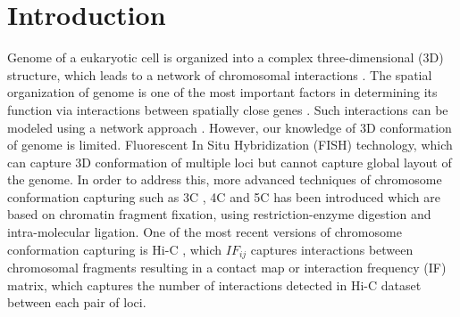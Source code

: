 \documentclass[a4,center,fleqn]{NAR}
\begin{document}
\section{Introduction}
Genome of a eukaryotic cell is organized into a
complex three-dimensional (3D) structure, which
leads to a network of chromosomal interactions \cite{dekker2008gene}.
The spatial organization of genome is one of
the most important factors in determining its
function \cite{fraser2007nuclear} via interactions between
spatially close genes \cite{kagey2010mediator}. Such
interactions can be modeled using a network approach
\cite{kagey2010mediator}. However, our knowledge of
3D conformation of genome is limited. Fluorescent In
Situ Hybridization (FISH) technology, which can
capture 3D conformation of multiple loci but cannot
capture global layout of the genome. In order to
address this, more advanced techniques of chromosome
conformation capturing such as 3C \cite{dekker2002capturing},
4C \cite{simonis2006nuclear} and 5C \cite{dostie2007mapping}
has been introduced which are based on chromatin fragment
fixation, using restriction-enzyme digestion and
intra-molecular ligation. One of the most recent
versions of chromosome conformation capturing is
Hi-C \cite{rao20143d, lieberman2009comprehensive},
which $IF_{ij}$ captures interactions between chromosomal
fragments resulting in a contact map or interaction frequency
(IF) matrix, which captures the number of interactions
detected in Hi-C dataset between each pair of loci.
\end{document}
